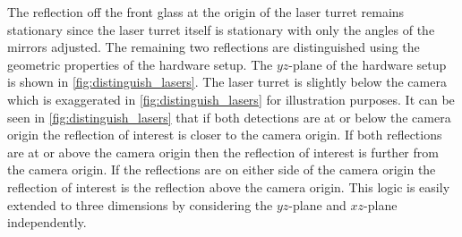 The reflection off the front glass at the origin of the laser turret remains stationary since the laser turret itself is stationary with only the angles of the mirrors adjusted. The remaining two reflections are distinguished using the geometric properties of the hardware setup. The $yz$-plane of the hardware setup is shown in \autoref{fig:distinguish_lasers}. The laser turret is slightly below the camera which is exaggerated in \autoref{fig:distinguish_lasers} for illustration purposes. It can be seen in \autoref{fig:distinguish_lasers} that if both detections are at or below the camera origin the reflection of interest is closer to the camera origin. If both reflections are at or above the camera origin then the reflection of interest is further from the camera origin. If the reflections are on either side of the camera origin the reflection of interest is the reflection above the camera origin. This logic is easily extended to three dimensions by considering the $yz$-plane and $xz$-plane independently.
